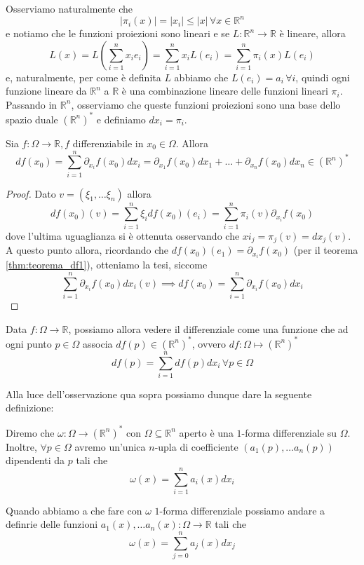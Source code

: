 \documentclass[openany, italian]{book}
\begin{document}
Osserviamo naturalmente che
$$
|\pi_i(x)| = |x_i| \leq |x| \, \forall x \in \mathbb{R}^n
$$ 
e notiamo che le funzioni proiezioni sono lineari e se $L: \mathbb{R}^n \to \mathbb{R}$ è lineare, allora
$$
L(x) = L \left( \sum_{i=1}^n x_i e_i \right) = \sum_{i=1}^n x_i L(e_i) = \sum_{i=1}^n \pi_i(x) L(e_i)
$$
e, naturalmente, per come è definita $L$ abbiamo che $L(e_i) = a_i \, \forall i$, quindi ogni funzione lineare da $\mathbb{R}^n$ a $\mathbb{R}$ è una combinazione lineare delle funzioni lineari $\pi_i$. \\
Passando in $\mathbb{R}^n$, osserviamo che queste funzioni proiezioni sono una base dello spazio duale $(\mathbb{R}^n)^{*}$ e definiamo $dx_i = \pi_i$. \\
\begin{prop}
Sia $f: \Omega \to \mathbb{R}, f$ differenziabile in $x_0 \in \Omega$. Allora
$$
df(x_0) = \sum_{i=1}^n \partial_{x_i} f(x_0)dx_i = \partial_{x_1} f(x_0)dx_1 + \ldots + \partial_{x_n} f(x_0)dx_n \in (\mathbb{R}^n)^{*}
$$
\end{prop}
\begin{proof}
Dato $v=(\xi_1, \ldots \xi_n)$ allora
$$
df(x_0)(v) = \sum_{i=1}^n \xi_i df(x_0)(e_i) = \sum_{i=1}^n \pi_i(v) \partial_{x_i} f(x_0)$$
dove l'ultima uguaglianza si è ottenuta osservando che $xi_j = \pi_j(v) = dx_j(v)$. A questo punto allora, ricordando che $df(x_0)(e_1) = \partial_{x_i} f(x_0)$ (per il teorema \ref{thm:teorema_df1}), otteniamo la tesi, siccome
$$\sum_{i=1}^n \partial_{x_i} f(x_0) dx_i(v) \implies df(x_0) = \sum_{i=1}^n \partial_{x_i} f(x_0) dx_i
$$
\end{proof}
\begin{remark}
Data $f: \Omega \to \mathbb{R}$, possiamo allora vedere il differenziale come una funzione che ad ogni punto $p \in \Omega$ associa $df(p) \in (\mathbb{R}^n)^{*}$, ovvero $df: \Omega \mapsto (\mathbb{R}^n)^{*}$
$$
df(p) = \sum_{i=1}^n df(p)dx_i \, \forall p \in \Omega
$$
\end{remark}
Alla luce dell'osservazione qua sopra possiamo dunque dare la seguente definizione:
\begin{definition}
Diremo che $\omega: \Omega \to (\mathbb{R}^n)^{*}$ con $\Omega \subseteq \mathbb{R}^n$ aperto è una $1$-forma differenziale su $\Omega$. Inoltre, $\forall p \in \Omega$ avremo un'unica $n$-upla di coefficiente $(a_1(p), \ldots a_n(p))$ dipendenti da $p$ tali che
$$
\omega(x) = \sum_{i=1}^n a_i(x)dx_i
$$
\end{definition}
\begin{remark}
\noindent Quando abbiamo a che fare con $\omega$ $1$-forma differenziale possiamo andare a definrie delle funzioni $a_1(x), \ldots a_n(x): \Omega \to \mathbb{R}$ tali che
$$
\omega(x) = \sum_{j=0}^n a_j(x)dx_j
$$
\end{remark}
\end{document}

